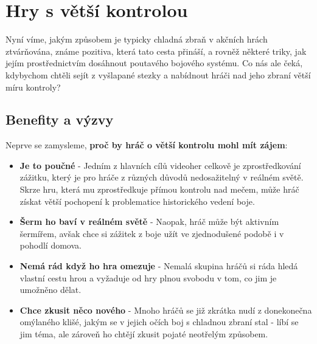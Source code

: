 \pagebreak


\section{Hry s větší kontrolou} \label{gamesWithMoreDirectControll}

Nyní víme, jakým způsobem je typicky chladná zbraň v akčních hrách ztvárňována, známe pozitiva, která tato cesta přináší, a rovněž některé triky, jak jejím prostřednictvím dosáhnout poutavého bojového systému. Co nás ale čeká, kdybychom chtěli sejít z vyšlapané stezky a nabídnout hráči nad jeho zbraní větší míru kontroly?

\subsection{Benefity a výzvy} \label{moreControlBenefitsSection}

Neprve se zamysleme, \textbf{proč by hráč o větší kontrolu mohl mít zájem}:
\begin{itemize}
    \item \textbf{Je to poučné} - Jedním z hlavních cílů videoher celkově je zprostředkování zážitku, který je pro hráče z různých důvodů nedosažitelný v reálném světě. Skrze hru, která mu zprostředkuje přímou kontrolu nad mečem, může hráč získat větší pochopení k problematice historického vedení boje.
    \item \textbf{Šerm ho baví v reálném světě} - Naopak, hráč může být aktivním šermířem, avšak chce si zážitek z boje užít ve zjednodušené podobě i v pohodlí domova.
    \item \textbf{Nemá rád když ho hra omezuje} - Nemalá skupina hráčů si ráda hledá vlastní cestu hrou a vyžaduje od hry plnou svobodu v tom, co jim je umožněno dělat. 
    \item \textbf{Chce zkusit něco nového} - Mnoho hráčů se již zkrátka nudí z donekonečna omýlaného klišé, jakým se v jejich očích boj s chladnou zbraní stal - líbí se jim téma, ale zároveň ho chtějí zkusit pojaté neotřelým způsobem.
\end{itemize}

